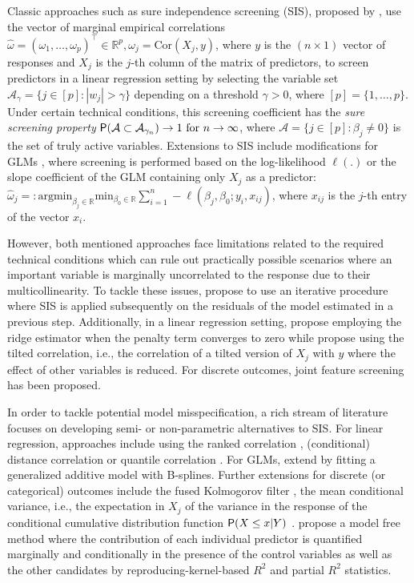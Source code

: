 \documentclass[
  article,
  nojss]{jss}
\begin{document}
Classic approaches such as sure independence screening (SIS), proposed
by \citet{Fan2007SISforUHD}, use the vector of marginal empirical
correlations
\(\hat\omega=(\omega_1,\ldots ,\omega_p)^\top\in\mathbb{R}^p,\omega_j=\text{Cor}(X_{j},y)\),
where \(y\) is the \((n\times 1)\) vector of responses and \(X_{j}\) is
the \(j\)-th column of the matrix of predictors, to screen predictors in
a linear regression setting by selecting the variable set
\(\mathcal{A}_\gamma = \{j\in [p]:|w_j|>\gamma\}\) depending on a
threshold \(\gamma>0\), where \([p]=\{1,\dots,p\}\). Under certain
technical conditions, this screening coefficient has the \emph{sure
screening property}
\(\mathsf{P}(\mathcal{A} \subset \mathcal{A}_{\gamma_n})\to 1 \text{ for } n\to \infty\),
where \(\mathcal{A}=\{j\in[p]:\beta_j\neq 0\}\) is the set of truly
active variables. Extensions to SIS include modifications for GLMs
\citep{Fan2010sisglms}, where screening is performed based on the
log-likelihood \(\ell(.)\) or the slope coefficient of the GLM
containing only \(X_j\) as a predictor:
\(\hat\omega_j=: \text{argmin}_{\beta_j\in\mathbb{R}}\text{min}_{{\beta_0}\in\mathbb{R}}\sum_{i=1}^n -\ell(\beta_j,\beta_0;y_i,x_{ij})\),
where \(x_{ij}\) is the \(j\)-th entry of the vector \(x_i\).

However, both mentioned approaches face limitations related to the
required technical conditions which can rule out practically possible
scenarios where an important variable is marginally uncorrelated to the
response due to their multicollinearity. To tackle these issues,
\citet{fan2009ultrahigh} propose to use an iterative procedure where SIS
is applied subsequently on the residuals of the model estimated in a
previous step. Additionally, in a linear regression setting,
\citet{Wang2015HOLP} propose employing the ridge estimator when the
penalty term converges to zero while \citet{cho2012high} propose using
the tilted correlation, i.e., the correlation of a tilted version of
\(X_j\) with \(y\) where the effect of other variables is reduced. For
discrete outcomes, joint feature screening \citep{SMLE2014} has been
proposed.

In order to tackle potential model misspecification, a rich stream of
literature focuses on developing semi- or non-parametric alternatives to
SIS. For linear regression, approaches include using the ranked
correlation \citep{zhu2011model}, (conditional) distance correlation
\citep{li2012feature, wang2015conditional} or quantile correlation
\citep{ma2016robust}. For GLMs, \citet{fan2011nonparametric} extend
\citet{Fan2010sisglms} by fitting a generalized additive model with
B-splines. Further extensions for discrete (or categorical) outcomes
include the fused Kolmogorov filter \citep{mai2013kolmogorov}, the mean
conditional variance, i.e., the expectation in \(X_j\) of the variance
in the response of the conditional cumulative distribution function
\(\mathsf{P}(X\leq x|Y)\) \citep{cui2015model}. \citet{ke2023sufficient}
propose a model free method where the contribution of each individual
predictor is quantified marginally and conditionally in the presence of
the control variables as well as the other candidates by
reproducing-kernel-based \(R^2\) and partial \(R^2\) statistics.
\end{document}
